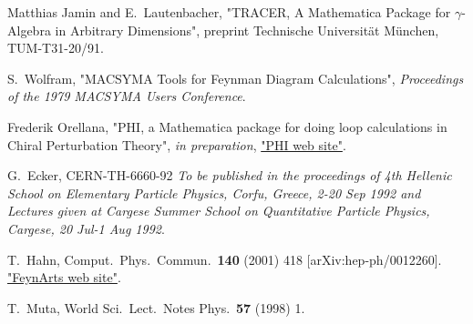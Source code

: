 \begin{thebibliography}{99}
Matthias Jamin and E.~Lautenbacher, 
"TRACER, A Mathematica Package for $\gamma$-Algebra in Arbitrary Dimensions",
preprint Technische Universit\"at M\"unchen, TUM-T31-20/91.

 S.~Wolfram, "MACSYMA Tools for Feynman Diagram Calculations",
{\sl Proceedings of the 1979 MACSYMA Users Conference}.

 Frederik Orellana, "PHI, a Mathematica package for doing loop calculations in Chiral Perturbation Theory", {\it in preparation}, \href{http://www.feyncalc.org/phi/}{"PHI web site"}.

G.~Ecker,
CERN-TH-6660-92
{\it To be published in the proceedings of 4th Hellenic School on Elementary Particle Physics, Corfu, Greece, 2-20 Sep 1992 and Lectures given at
Cargese Summer School on Quantitative Particle Physics, Cargese, 20 Jul-1 Aug 1992}.

T.~Hahn,
Comput.\ Phys.\ Commun.\  {\bf 140} (2001) 418
[arXiv:hep-ph/0012260].
\href{http://www.feynarts.de/}{"FeynArts web site"}.

T.~Muta,
World Sci.\ Lect.\ Notes Phys.\  {\bf 57} (1998) 1.

\end{thebibliography}
